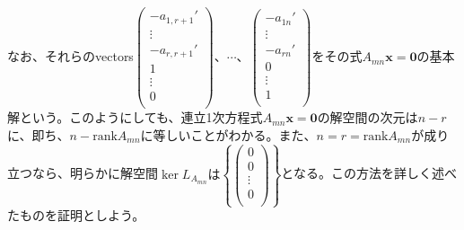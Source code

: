 \documentclass[dvipdfmx]{jsarticle}
\begin{document}
\begin{dfn}
なお、それらのvectors$\begin{pmatrix}
 - a_{1,r + 1}' \\
 \vdots \\
 - a_{r,r + 1}' \\
1 \\
 \vdots \\
0 \\
\end{pmatrix}$、$\cdots$、$\begin{pmatrix}
 - a_{1n}' \\
 \vdots \\
 - a_{rn}' \\
0 \\
 \vdots \\
1 \\
\end{pmatrix}$をその式$A_{mn}\mathbf{x} = \mathbf{0}$の基本解という。このようにしても、連立1次方程式$A_{mn}\mathbf{x} = \mathbf{0}$の解空間の次元は$n - r$に、即ち、$n - {\mathrm{rank}}A_{mn}$に等しいことがわかる。また、$n = r = {\mathrm{rank}}A_{mn}$が成り立つなら、明らかに解空間$\ker L_{A_{mn}}は\left\{ \begin{pmatrix}
0 \\
0 \\
 \vdots \\
0 \\
\end{pmatrix} \right\}$となる。この方法を詳しく述べたものを証明としよう。
\end{dfn}
\end{document}
